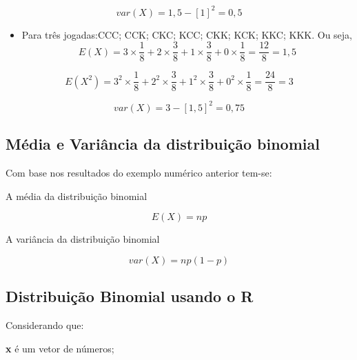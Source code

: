 \documentclass[
]{book}
\providecommand{\tightlist}{%
  \setlength{\itemsep}{0pt}\setlength{\parskip}{0pt}}
\begin{document}
\begin{equation*}
  var(X) = 1,5 - [1]^2 = 0,5
\end{equation*}

\begin{itemize}
\tightlist
\item
  Para três jogadas:CCC; CCK; CKC; KCC; CKK; KCK; KKC; KKK. Ou seja,
  \begin{equation*}
  E(X) = 3 \times \frac{1}{8} + 2 \times \frac{3}{8} + 1 \times \frac{3}{8} + 0 \times \frac{1}{8} = \frac{12}{8} = 1,5
  \end{equation*}
\end{itemize}

\begin{equation*}
  E(X^2) = 3^2\times \frac{1}{8} + 2^2 \times \frac{3}{8} + 1^2 \times \frac{3}{8} +  0^2\times \frac{1}{8} = \frac{24}{8} = 3
\end{equation*}

\begin{equation*}
  var(X) = 3 - [1,5]^2 = 0,75
\end{equation*}

\hypertarget{muxe9dia-e-variuxe2ncia-da-distribuiuxe7uxe3o-binomial}{%
\subsection{Média e Variância da distribuição binomial}\label{muxe9dia-e-variuxe2ncia-da-distribuiuxe7uxe3o-binomial}}

Com base nos resultados do exemplo numérico anterior tem-se:

A média da distribuição binomial

\begin{equation*}
  E(X) = np
\end{equation*}

A variância da distribuição binomial

\begin{equation*}
  var(X) = np(1-p)
\end{equation*}

\hypertarget{distribuiuxe7uxe3o-binomial-usando-o-r}{%
\subsection{Distribuição Binomial usando o R}\label{distribuiuxe7uxe3o-binomial-usando-o-r}}

Considerando que:

\textbf{x} é um vetor de números;
\end{document}
